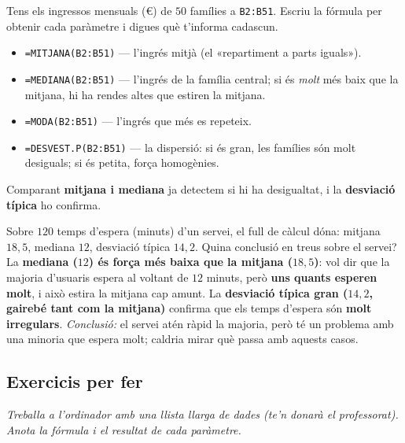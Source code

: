 \begin{exresolt}
Tens els ingressos mensuals (€) de $50$ famílies a \texttt{B2:B51}. Escriu la fórmula
per obtenir cada paràmetre i digues què t'informa cadascun.
\solucio
\begin{itemize}[leftmargin=1.4em, itemsep=1pt]
  \item \texttt{=MITJANA(B2:B51)} — l'ingrés mitjà (el «repartiment a parts iguals»).
  \item \texttt{=MEDIANA(B2:B51)} — l'ingrés de la família central; si és \emph{molt}
        més baix que la mitjana, hi ha rendes altes que estiren la mitjana.
  \item \texttt{=MODA(B2:B51)} — l'ingrés que més es repeteix.
  \item \texttt{=DESVEST.P(B2:B51)} — la dispersió: si és gran, les famílies són molt
        desiguals; si és petita, força homogènies.
\end{itemize}
Comparant \textbf{mitjana i mediana} ja detectem si hi ha desigualtat, i la
\textbf{desviació típica} ho confirma.
\end{exresolt}

\begin{exresolt}
Sobre $120$ temps d'espera (minuts) d'un servei, el full de càlcul dóna:
mitjana $18,5$, mediana $12$, desviació típica $14,2$. Quina conclusió en treus sobre
el servei?
\solucio
La \textbf{mediana ($12$) és força més baixa que la mitjana ($18,5$)}: vol dir que la
majoria d'usuaris espera al voltant de $12$ minuts, però \textbf{uns quants esperen
molt}, i això estira la mitjana cap amunt. La \textbf{desviació típica gran ($14,2$,
gairebé tant com la mitjana)} confirma que els temps d'espera són \textbf{molt
irregulars}. \emph{Conclusió:} el servei atén ràpid la majoria, però té un problema
amb una minoria que espera molt; caldria mirar què passa amb aquests casos.
\end{exresolt}

\subsection{Exercicis per fer}

\noindent\textit{Treballa a l'ordinador amb una llista llarga de dades (te'n donarà
el professorat). Anota la fórmula i el resultat de cada paràmetre.}

